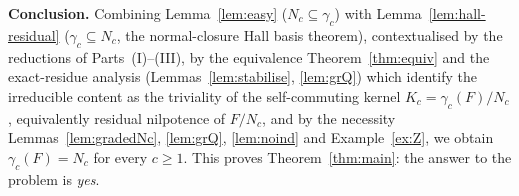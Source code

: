 \documentclass{amsart}
\theoremstyle{definition}
\theoremstyle{remark}
\begin{document}
\bigskip
\noindent\textbf{Conclusion.}
Combining Lemma~\ref{lem:easy} ($N_c\subseteq\gamma_c$) with
Lemma~\ref{lem:hall-residual} ($\gamma_c\subseteq N_c$, the normal-closure Hall
basis theorem), contextualised by the reductions of Parts~(I)--(III), by the
equivalence Theorem~\ref{thm:equiv} and the exact-residue analysis
(Lemmas~\ref{lem:stabilise}, \ref{lem:grQ}) which identify the irreducible content
as the triviality of the self-commuting kernel $K_c=\gamma_c(F)/N_c$, equivalently
residual nilpotence of $F/N_c$, and by the necessity Lemmas~\ref{lem:gradedNc},
\ref{lem:grQ}, \ref{lem:noind} and Example~\ref{ex:Z}, we obtain
$\gamma_c(F)=N_c$ for every $c\ge1$. This proves Theorem~\ref{thm:main}: the answer
to the problem is \emph{yes}.
\end{document}
